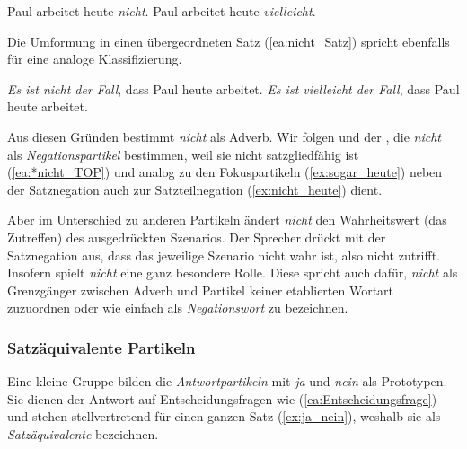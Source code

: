 \ea \label{ea:nicht_Kommentaradv}
\ea \label{ea:nicht_KAdv?} Paul arbeitet heute \textit{nicht}.
\ex \label{ex:vielleicht_Kadv} Paul arbeitet heute \textit{vielleicht}.
\z 
\z 

Die Umformung in einen übergeordneten Satz (\ref{ea:nicht_Satz}) spricht ebenfalls für eine analoge Klassifizierung.

\ea \label{ea:nicht_Satz}
\ea \label{ea:nicht_der_Fall} \textit{Es ist nicht der Fall}, dass Paul heute arbeitet.
\ex \label{ex:vielleicht_der_Fall} \textit{Es ist vielleicht der Fall}, dass Paul heute arbeitet.
\z 
\z 

Aus diesen Gründen bestimmt \citet[243]{Eisenberg2020_Satz} \textit{nicht} als Adverb. Wir folgen \citet[70]{Elst_Habermann_SynAn} und der \citet[800, §1404]{Duden2022}, die \textit{nicht} als \textit{Negationspartikel} bestimmen, weil sie nicht satzgliedfähig ist (\ref{ea:*nicht_TOP}) und analog zu den Fokuspartikeln (\ref{ex:sogar_heute}) neben der Satznegation auch zur Satzteilnegation (\ref{ex:nicht_heute}) dient.

\ea \label{ea:nicht_NegPart}
\label{ea:*nicht_TOP}
\label{ex:sogar_heute}
\label{ex:nicht_heute} 
\z 
\z 

Aber im Unterschied zu anderen Partikeln ändert \textit{nicht} den Wahrheitswert (das Zutreffen) des ausgedrückten Szenarios. Der Sprecher drückt mit der Satznegation aus, dass das jeweilige Szenario nicht wahr ist, also nicht zutrifft. Insofern spielt \textit{nicht} eine ganz besondere Rolle. Diese spricht auch dafür, \textit{nicht} als Grenzgänger zwischen Adverb und Partikel keiner etablierten Wortart zuzuordnen oder wie \citet[544]{HelbigBuscha} einfach als \textit{Negationswort} zu bezeichnen. 


\subsubsection{Satzäquivalente Partikeln}\label{subsubsection:Satzäquvalenz}

\largerpage[2]
Eine kleine Gruppe bilden die \textit{Antwortpartikeln} mit \textit{ja} und \textit{nein} als Prototypen. Sie dienen der Antwort auf Entscheidungsfragen wie (\ref{ea:Entscheidungsfrage}) und stehen stellvertretend für einen ganzen Satz (\ref{ex:ja_nein}), weshalb sie \citet[440]{HelbigBuscha} als \textit{Satzäquivalente} bezeichnen.


